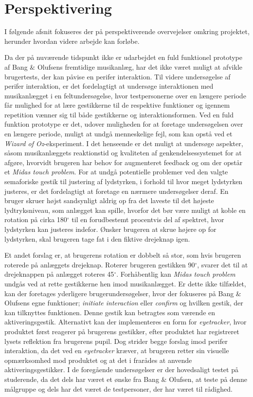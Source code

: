 \chapter{Perspektivering}
\label{Perspektivering}
%
I følgende afsnit fokuseres der på perspektiverende overvejelser omkring projektet, herunder hvordan videre arbejde kan forløbe.

Da der på nuværende tidspunkt ikke er udarbejdet en fuld funktionel prototype af Bang $\&$ Olufsens fremtidige musikanlæg, har det ikke været muligt at afvikle brugertests, der kan påvise en perifer interaktion. Til videre undersøgelse af perifer interaktion, er det fordelagtigt at undersøge interaktionen med musikanlægget i en feltundersøgelse, hvor testpersonerne over en længere periode får mulighed for at lære gestikkerne til de respektive funktioner og igennem repetition vænner sig til både gestikkerne og interaktionsformen. Ved en fuld funktion prototype er det, udover muligheden for at foretage undersøgelsen over en længere periode, muligt at undgå menneskelige fejl, som kan opstå ved et \textit{Wizard of Oz}-eksperiment. I det henseende er det muligt at undersøge aspekter, såsom musikanlæggets reaktionstid og kvaliteten af genkendelsessystemet for at afgøre, hvorvidt brugeren har behov for augmenteret feedback og om der opstår et \textit{Midas touch problem}.\blankline
%
For at undgå potentielle problemer ved den valgte semaforiske gestik til justering af lydstyrken, i forhold til hvor meget lydstyrken justeres, er det fordelagtigt at foretage en nærmere undersøgelser deraf. En bruger skruer højst sandsynligt aldrig op fra det laveste til det højeste lydtryksniveau, som anlægget kan spille, hvorfor det bør være muligt at koble en rotation på cirka 180$^{\circ}$ til en forudbestemt procentvis del af spektret, hvor lydstyrken kan justeres indefor. Ønsker brugeren at skrue højere op for lydstyrken, skal brugeren tage fat i den fiktive drejeknap igen. 

Et andet forslag er, at brugerens rotation er dobbelt så stor, som hvis brugeren roterede på anlæggets drejeknap. Roterer brugeren gestikken 90$^{\circ}$, svarer det til at drejeknappen på anlægget roteres 45$^{\circ}$.\blankline 
%
Forhåbentlig kan \textit{Midas touch problem} undgås ved at rette gestikkerne hen imod musikanlægget. Er dette ikke tilfældet, kan der foretages yderligere brugerundersøgelser, hvor der fokuseres på Bang $\&$ Olufsens egne funktioner; \textit{initiate interaction} eller \textit{confirm} og hvilken gestik, der kan tilknyttes funktionen. Denne gestik kan betragtes som værende en aktiveringsgestik. Alternativt kan der implementeres en form for \textit{eyetracker}, hvor produktet først reagerer på brugerens gestikker, efter produktet har registreret lysets reflektion fra brugerens pupil. Dog strider begge forslag imod perifer interaktion, da det ved en \textit{eyetracker} kræver, at brugeren retter sin visuelle opmærksomhed mod produktet og at det i  frarådes at anvende aktiveringsgestikker.\blankline   
%
I de foregående undersøgelser er der hovedsaligt testet på studerende, da det dels har været et ønske fra Bang $\&$ Olufsen, at teste på denne målgruppe og dels har det været de testpersoner, der har været til rådighed. 

